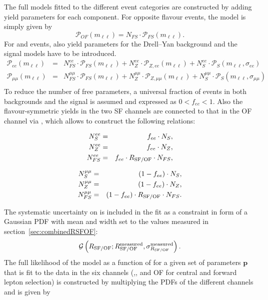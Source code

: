The full models fitted to the different event categories are constructed by adding yield parameters for each component. For opposite flavour events, the model is simply given by 
\begin{equation*}
 \mathcal{P}_{OF}(m_{\ell\ell}) = N_{FS} \cdot \mathcal{P}_{FS}(m_{\ell\ell}).
\end{equation*}
For \EE and \MM events, also yield parameters for the Drell--Yan background and the signal models have to be introduced. 
\begin{eqnarray*}
 {\mathcal{P}}_{ee}(m_{\ell\ell})     & = &  N_{FS}^{ee} \cdot {\mathcal{P}}_{FS}(m_{\ell\ell})      +  N_{Z}^{ee} \cdot {\mathcal{P}}_{Z,ee}(m_{\ell\ell})           +   N_{S}^{ee} \cdot  {\mathcal{P}}_{S}(m_{\ell\ell},\sigma_{ee}) \\
 {\mathcal{P}}_{\mu\mu}(m_{\ell\ell}) & = &   N_{FS}^{\mu\mu} \cdot {\mathcal{P}}_{FS}(m_{\ell\ell})  +  N_{Z}^{\mu\mu} \cdot {\mathcal{P}}_{Z,\mu\mu}(m_{\ell\ell})   +   N_{S}^{\mu\mu} \cdot {\mathcal{P}}_{S}(m_{\ell\ell},\sigma_{\mu\mu}) \\
\end{eqnarray*}
To reduce the number of free parameters, a universal fraction of \EE events in both backgrounds and the signal is assumed and expressed as $0 < f_{ee} < 1$. Also the flavour-symmetric yields in the two SF channels are connected to that in the OF channel via \Rsfof, which allows to construct the following relations:
\begin{center}
  \begin{minipage}[t]{0.49\textwidth}
\begin{eqnarray*}
 N_{S}^{ee} &=& f_{ee} \cdot N_{S}, \\
  N_{Z}^{ee} &=& f_{ee} \cdot N_{Z},\\
    N_{FS}^{ee} &=& f_{ee} \cdot R_{\text{SF/OF}} \cdot N_{FS}, \\
\end{eqnarray*}
  \end{minipage}
  \begin{minipage}[t]{0.49\textwidth}
\begin{eqnarray*}
 N_{S}^{\mu\mu} &=& (1-f_{ee}) \cdot N_{S}, \\
  N_{Z}^{\mu\mu} &=& (1-f_{ee}) \cdot N_{Z}, \\
    N_{FS}^{\mu\mu} &=& (1-f_{ee}) \cdot R_{\text{SF/OF}} \cdot N_{FS}. \\
\end{eqnarray*}
  \end{minipage}
\end{center}
The systematic uncertainty on \Rsfof is included in the fit as a constraint in form of a Gaussian PDF with mean and width set to the values measured in section~\ref{sec:combinedRSFOF}:
\begin{equation*}
{\mathcal{G}}\left(R_{\text{SF/OF}};R_{\text{SF/OF}}^{\text{measured}},\sigma_{R_{\text{SF/OF}}}^{\text{measured}}\right).
\end{equation*}
The full likelihood of the model as a function of \mll for a given set of parameters $\mathbf{p}$ that is fit to the data in the six channels (\EE,\MM, and OF for central and forward lepton selection) is constructed by multiplying the PDFs of the different channels and is given by

